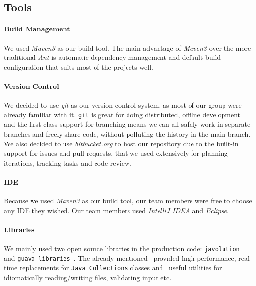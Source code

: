 \subsection{Tools}

\paragraph{Build Management}

We used \textit{Maven3} as our build tool. The main advantage of \textit{Maven3} over the more traditional \textit{Ant} is automatic dependency management and default build configuration that suits most of the projects well.

\paragraph{Version Control}
We decided to use \textit{git} as our version control system, as most of our group were already familiar with it. \texttt{git} is great for doing distributed, offline development and the first-class support for branching means we can all safely work in separate branches and freely share code, without polluting the history in the main branch. We also decided to use \textit{bitbucket.org} to host our repository due to the built-in support for issues and pull requests, that we used extensively for planning iterations, tracking tasks and code review.

\paragraph{IDE}
Because we used \textit{Maven3} as our build tool, our team members were free to choose any IDE they wished. Our team members used \textit{IntelliJ IDEA} and \textit{Eclipse}.

\paragraph{Libraries}
We mainly used two open source libraries in the production code: \texttt{javolution}~\cite{javolution} and \texttt{guava-libraries}~\cite{guava}. The already mentioned~\cite{javolution} provided high-performance, real-time replacements for \texttt{Java Collections} classes and~\cite{guava} useful utilities for idiomatically reading/writing files, validating input etc.

